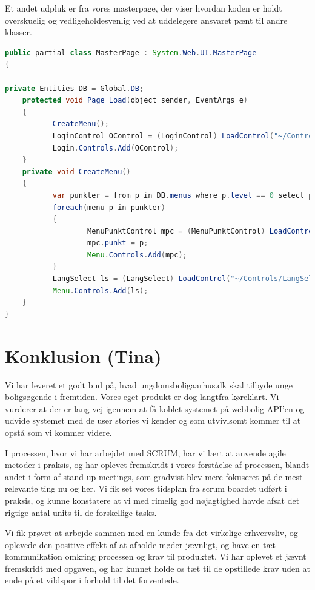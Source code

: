 \documentclass[12pt, a4paper]{report}
\begin{document}
Et andet udpluk er fra vores masterpage, der viser hvordan koden er holdt overskuelig og vedligeholdesvenlig ved at uddelegere ansvaret pænt til andre klasser.
\begin{lstlisting}[basicstyle=\tiny, columns=fullflexible, language=java, frame=single]
public partial class MasterPage : System.Web.UI.MasterPage
{

private Entities DB = Global.DB;
    protected void Page_Load(object sender, EventArgs e)
    {
           CreateMenu();
           LoginControl OControl = (LoginControl) LoadControl("~/Controls/LoginControl.ascx");
           Login.Controls.Add(OControl);
    }
    private void CreateMenu()
    {
           var punkter = from p in DB.menus where p.level == 0 select p;
           foreach(menu p in punkter)
           {
                   MenuPunktControl mpc = (MenuPunktControl) LoadControl("~/Controls/MenuPunktControl.ascx");
                   mpc.punkt = p;
                   Menu.Controls.Add(mpc);
           }
           LangSelect ls = (LangSelect) LoadControl("~/Controls/LangSelect.ascx");
           Menu.Controls.Add(ls);
    }
}
\end{lstlisting}

\chapter{Konklusion (Tina)}
Vi har leveret et godt bud på, hvad ungdomsboligaarhus.dk skal tilbyde unge boligsøgende i fremtiden. Vores eget produkt er dog langtfra køreklart. Vi vurderer at der er lang vej igennem at få koblet systemet på webbolig API’en og udvide systemet med de user stories vi kender og som utvivlsomt kommer til at opstå som vi kommer videre.

I processen, hvor vi har arbejdet med SCRUM, har vi lært at anvende agile metoder i praksis, og har oplevet fremskridt i vores forståelse af processen, blandt andet i form af stand up meetings, som gradvist blev mere fokuseret på de mest relevante ting nu og her. Vi fik set vores tidsplan fra scrum boardet udført i praksis, og kunne konstatere at vi med rimelig god nøjagtighed havde afsat det rigtige antal units til de forskellige tasks.

Vi fik prøvet at arbejde sammen med en kunde fra det virkelige erhvervsliv, og oplevede den positive effekt af at afholde møder jævnligt, og have en tæt kommunikation omkring processen og krav til produktet. Vi har oplevet et jævnt fremskridt med opgaven, og har kunnet holde os tæt til de opstillede krav uden at ende på et vildspor i forhold til det forventede.
\end{document}
